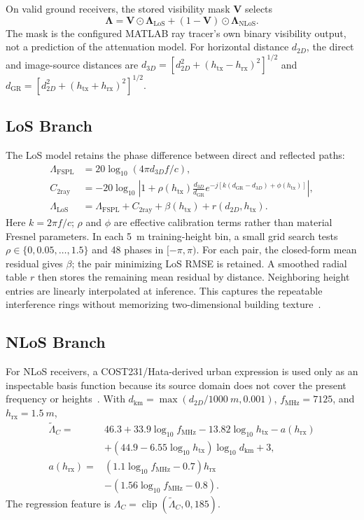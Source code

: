 \documentclass[10pt,conference,letterpaper]{IEEEtran}
\begin{document}
On valid ground receivers, the stored visibility mask $\mathbf V$ selects
\begin{equation}
\boldsymbol\Lambda=\mathbf V\odot\boldsymbol\Lambda_{\mathrm{LoS}}
 +(1-\mathbf V)\odot\boldsymbol\Lambda_{\mathrm{NLoS}}.
\label{eq:combined}
\end{equation}
The mask is the configured MATLAB ray tracer's own binary visibility output,
not a prediction of the attenuation model. For horizontal distance $d_{2D}$,
the direct and image-source distances are
$d_{3D}=[d_{2D}^2+(h_{\mathrm{tx}}-h_{\mathrm{rx}})^2]^{1/2}$ and
$d_{\mathrm{GR}}=[d_{2D}^2+(h_{\mathrm{tx}}+h_{\mathrm{rx}})^2]^{1/2}$.

\subsection{LoS Branch}
The LoS model retains the phase difference between direct and reflected paths:
\begin{align}
\Lambda_{\mathrm{FSPL}}&=20\log_{10}(4\pi d_{3D}f/c),\label{eq:fspl}\\
C_{\mathrm{2ray}}&=-20\log_{10}\left|1+\rho(h_{\mathrm{tx}})
\frac{d_{3D}}{d_{\mathrm{GR}}}
e^{-j[k(d_{\mathrm{GR}}-d_{3D})+\phi(h_{\mathrm{tx}})]}\right|,\label{eq:tworay}\\
\Lambda_{\mathrm{LoS}}&=\Lambda_{\mathrm{FSPL}}+C_{\mathrm{2ray}}
+\beta(h_{\mathrm{tx}})+r(d_{2D},h_{\mathrm{tx}}).\label{eq:pl_los}
\end{align}
Here $k=2\pi f/c$; $\rho$ and $\phi$ are effective calibration terms rather
than material Fresnel parameters. In each \SI{5}{m} training-height bin, a
small grid search tests $\rho\in\{0,0.05,\ldots,1.5\}$ and 48 phases in
$[-\pi,\pi)$. For each pair, the closed-form mean residual gives $\beta$; the
pair minimizing LoS RMSE is retained. A smoothed radial table $r$ then stores
the remaining mean residual by distance. Neighboring height entries are
linearly interpolated at inference. This captures the repeatable interference
rings without memorizing two-dimensional building texture~\cite{rappaport}.

\subsection{NLoS Branch}
For NLoS receivers, a COST231/Hata-derived urban expression is used only as an
inspectable basis function because its source domain does not cover the
present frequency or heights~\cite{cost231}. With
$d_{\mathrm{km}}=\max(d_{2D}/\SI{1000}{m},0.001)$,
$f_{\mathrm{MHz}}=7125$, and $h_{\mathrm{rx}}=\SI{1.5}{m}$,
\begin{align}
\widetilde\Lambda_C={}&46.3+33.9\log_{10}f_{\mathrm{MHz}}
-13.82\log_{10}h_{\mathrm{tx}}-a(h_{\mathrm{rx}})\nonumber\\
&+(44.9-6.55\log_{10}h_{\mathrm{tx}})\log_{10}d_{\mathrm{km}}+3,\label{eq:cost}\\
a(h_{\mathrm{rx}})={}&(1.1\log_{10}f_{\mathrm{MHz}}-0.7)h_{\mathrm{rx}}\nonumber\\
&-(1.56\log_{10}f_{\mathrm{MHz}}-0.8).
\end{align}
The regression feature is $\Lambda_C=\operatorname{clip}
(\widetilde\Lambda_C,0,185)$.
\end{document}
